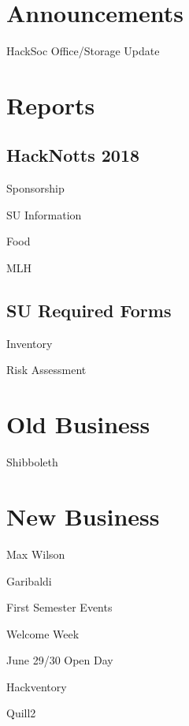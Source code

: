 \documentclass[11pt,hacksoc,agenda]{meetingmins}
\begin{document}
\maketitle

\section{Announcements}
\begin{items}
\item
HackSoc Office/Storage Update

\end{items}

\section{Reports}

\subsection{HackNotts 2018}
\begin{hiddensubitems}
	\item
	Sponsorship
	
	\item
	SU Information
	
	\item
	Food
	
	\item
	MLH
\end{hiddensubitems}


\subsection{SU Required Forms}
\begin{hiddensubitems}
	\item
	Inventory
	
	\item
	Risk Assessment
	
\end{hiddensubitems}


\section{Old Business}
\begin{items}
	\item
	Shibboleth
\end{items}

\section{New Business}
\begin{items}
	\item
	Max Wilson
	
	\item
	Garibaldi
	
	\item
	First Semester Events
	
	\item
	Welcome Week
	
	\item
	June 29/30 Open Day
	
	\item
	Hackventory
	
	\item
	Quill2
\end{items}

\vspace{1em}
\end{document}
